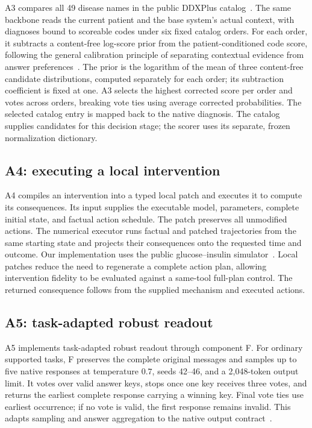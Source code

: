 A3 compares all 49 disease names in the public DDXPlus catalog~\cite{ddxplus}. The same backbone reads the current patient and the base system's actual context, with diagnoses bound to scoreable codes under six fixed catalog orders. For each order, it subtracts a content-free log-score prior from the patient-conditioned code score, following the general calibration principle of separating contextual evidence from answer preferences~\cite{zhao2021calibrate}. The prior is the logarithm of the mean of three content-free candidate distributions, computed separately for each order; its subtraction coefficient is fixed at one. A3 selects the highest corrected score per order and votes across orders, breaking vote ties using average corrected probabilities. The selected catalog entry is mapped back to the native diagnosis. The catalog supplies candidates for this decision stage; the scorer uses its separate, frozen normalization dictionary.

\subsection{A4: executing a local intervention}

A4 compiles an intervention into a typed local patch and executes it to compute its consequences. Its input supplies the executable model, parameters, complete initial state, and factual action schedule. The patch preserves all unmodified actions. The numerical executor runs factual and patched trajectories from the same starting state and projects their consequences onto the requested time and outcome. Our implementation uses the public glucose--insulin simulator~\cite{simglucose}. Local patches reduce the need to regenerate a complete action plan, allowing intervention fidelity to be evaluated against a same-tool full-plan control. The returned consequence follows from the supplied mechanism and executed actions.

\subsection{A5: task-adapted robust readout}

A5 implements task-adapted robust readout through component F. For ordinary supported tasks, F preserves the complete original messages and samples up to five native responses at temperature $0.7$, seeds 42--46, and a 2,048-token output limit. It votes over valid answer keys, stops once one key receives three votes, and returns the earliest complete response carrying a winning key. Final vote ties use earliest occurrence; if no vote is valid, the first response remains invalid. This adapts sampling and answer aggregation to the native output contract~\cite{wang2023selfconsistency}.

